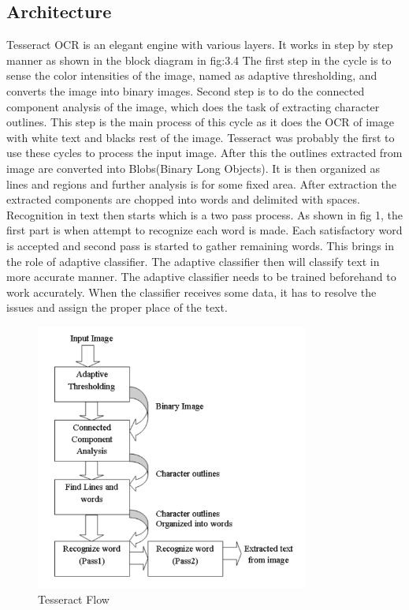 \subsection{Architecture}
Tesseract OCR is an elegant engine with various layers. It works in step by step manner as
shown in the block diagram in fig:3.4 The first step in the cycle is to sense the color intensities of the image, named as adaptive thresholding, and converts the image into binary images.
Second step is to do the connected component analysis of the image, which does the task of
extracting character outlines. This step is the main process of this cycle as it does the OCR of
image with white text and blacks rest of the image.
Tesseract was probably the first to use these cycles to process the input image. After this the
outlines extracted from image are converted into Blobs(Binary Long Objects). It is then organized as lines and regions and further analysis is for some fixed area. After extraction
the extracted components are chopped into words and delimited with spaces. Recognition in text
then starts which is a two pass process. As shown in fig 1, the first part is when attempt to
recognize each word is made. Each satisfactory word is accepted and second pass is started to
gather remaining words. This brings in the role of adaptive classifier. The adaptive classifier then will classify text in more accurate manner. The adaptive classifier needs to be trained beforehand
to work accurately. When the classifier receives some data, it has to resolve the issues and assign
the proper place of the text.

\begin{figure}[H]
\centering
\label{fig:flow} 
\includegraphics[width=0.8\textwidth]{tesseractFlow}
\caption {Tesseract Flow}
\end{figure}

